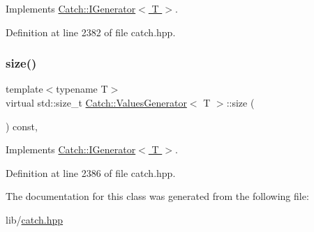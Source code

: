 Implements \hyperlink{struct_catch_1_1_i_generator_ad69e937cb66dba3ed9429c42abf4fce3}{Catch\+::\+I\+Generator$<$ T $>$}.



Definition at line 2382 of file catch.\+hpp.

\hypertarget{class_catch_1_1_values_generator_a9aa5b140ee502975cf35115e534ab771}{}\label{class_catch_1_1_values_generator_a9aa5b140ee502975cf35115e534ab771} 
\subsubsection{\texorpdfstring{size()}{size()}}
{\footnotesize\ttfamily template$<$typename T$>$ \\
virtual std\+::size\+\_\+t \hyperlink{class_catch_1_1_values_generator}{Catch\+::\+Values\+Generator}$<$ T $>$\+::size (\begin{DoxyParamCaption}{ }\end{DoxyParamCaption}) const\hspace{0.3cm}{\ttfamily [inline]}, {\ttfamily [virtual]}}



Implements \hyperlink{struct_catch_1_1_i_generator_a2e317253b03e838b6065ce69719a198e}{Catch\+::\+I\+Generator$<$ T $>$}.



Definition at line 2386 of file catch.\+hpp.



The documentation for this class was generated from the following file\+:\begin{DoxyCompactItemize}
\item 
lib/\hyperlink{catch_8hpp}{catch.\+hpp}\end{DoxyCompactItemize}
